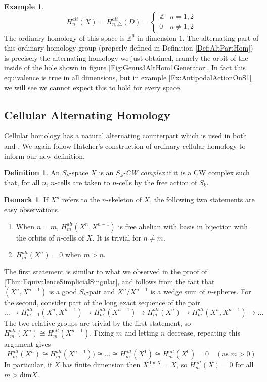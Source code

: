 \documentclass[11pt,a4paper,twoside]{article}
\theoremstyle{plain}
\theoremstyle{definition}
\newtheorem{defn}[thm]{Definition}
\theoremstyle{definition}
\theoremstyle{definition}
\theoremstyle{definition}
\newtheorem{example}[thm]{Example}
\theoremstyle{definition}
\newtheorem*{remark}{Remark}
\begin{document}
\begin{example}
$$H_n^{alt}(X)=H_{n,\triangle}^{alt}(D)=\begin{cases} \mathbb{Z} & n=1,2 \\ 0 & n\neq1,2 \end{cases}$$
The ordinary homology of this space is $\mathbb{Z}^6$ in dimension $1$. The alternating part of this ordinary homology group (properly defined in Definition \ref{Def:AltPartHom}) is precisely the alternating homology we just obtained, namely the orbit of the inside of the hole shown in figure \ref{Fig:Genus3AltHom1Generator}. In fact this equivalence is true in all dimensions, but in example \ref{Ex:AntipodalActionOnS1} we will see we cannot expect this to hold for every space.
\end{example}



\subsection{Cellular Alternating Homology}
\label{Sec:CellularAlternatingHomology}
Cellular homology has a natural alternating counterpart which is used in both \cite{Goryunov} and \cite{HoustonTopology}. We again follow Hatcher's construction of ordinary cellular homology to inform our new definition.

\begin{defn}
An $S_k$-space $X$ is an \emph{$S_k$-CW complex} if it is a CW complex such that, for all $n$, $n$-cells are taken to $n$-cells by the free action of $S_k$.
\end{defn}

\begin{remark}
If $X^n$ refers to the $n$-skeleton of $X$, the following two statements are easy observations.
\begin{enumerate}
    \item  When $n\!=\!m$, $H^{alt}_m(X^n,X^{n\!-\!1})$ is free abelian with basis in bijection with the orbits of $n$-cells of $X$. It is trivial for $n\neq m$.
    \item $H^{alt}_m(X^n)=0$ when $m>n$.
\end{enumerate}
The first statement is similar to what we observed in the proof of \ref{Thm:EquivalenceSimplicialSingular}, and follows from the fact that $(X^n,X^{n\!-\!1})$ is a good $S_k$-pair and $X^n/X^{n\!-\!1}$ is a wedge sum of $n$-spheres. For the second, consider part of the long exact sequence of the pair 
$$\dots\longrightarrow H^{alt}_{m+1}(X^n,X^{n-1})\longrightarrow H_m^{alt}(X^{n-1})\longrightarrow H_m^{alt}(X^n)\longrightarrow H_m^{alt}(X^n,X^{n-1})\longrightarrow\dots$$
The two relative groups are trivial by the first statement, so $H^{alt}_m(X^n)\cong H^{alt}_m(X^{n-1})$. Fixing $m$ and letting $n$ decrease, repeating this argument gives
$$H^{alt}_m(X^n)\cong H^{alt}_m(X^{n-1}))\cong \dots \cong H^{alt}_m(X^1)\cong H^{alt}_m(X^0)=0\quad(\text{as }m>0)$$
In particular, if $X$ has finite dimension then $X^{\text{dim}X}=X$, so $H^{alt}_m(X)=0$ for all $m>\text{dim}X$.
\end{remark}
\end{document}
